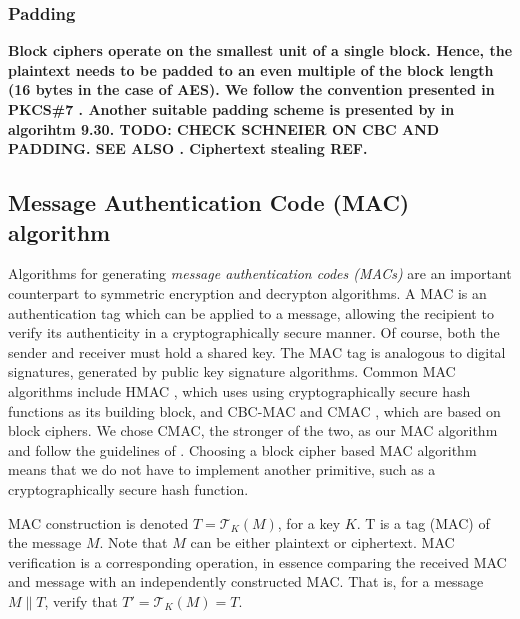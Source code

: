 
\subsubsection{Padding}

\textbf{Block ciphers operate on the smallest unit of a single block. Hence, the plaintext needs to be padded to an even multiple of the block length (16 bytes in the case of AES). We follow the convention presented in PKCS\#7 \cite{RFC-2315-kaliski-1998}. Another suitable padding scheme is presented by  in algorihtm 9.30. \textbf{TODO: CHECK SCHNEIER ON CBC AND PADDING.} \textbf{SEE ALSO \cite[Appendix A]{dworkin2001}.} \textbf{Ciphertext stealing REF. \cite{dworkin2010}}}

\subsection{Message Authentication Code (MAC) algorithm}

Algorithms for generating \textit{message authentication codes (MACs)} are an important counterpart to symmetric encryption and decrypton algorithms. A MAC is an authentication tag which can be applied to a message, allowing the recipient to verify its authenticity in a cryptographically secure manner. Of course, both the sender and receiver must hold a shared key. The MAC tag is analogous to digital signatures, generated by public key signature algorithms. Common MAC algorithms include HMAC \cite{}, which uses using cryptographically secure hash functions as its building block, and CBC-MAC \cite{} and CMAC , which are based on block ciphers. We chose CMAC, the stronger of the two, as our MAC algorithm and follow the guidelines of . Choosing a block cipher based MAC algorithm means that we do not have to implement another primitive, such as a cryptographically secure hash function.

MAC construction is denoted $T=\mathcal{T}_K(M)$, for a key $K$. T is a tag (MAC) of the message $M$. Note that $M$ can be either plaintext or ciphertext.
MAC verification is a corresponding operation, in essence comparing the received MAC and message with an independently constructed MAC. That is, for a message $M \parallel T$, verify that $T' = \mathcal{T}_K(M) = T$.

